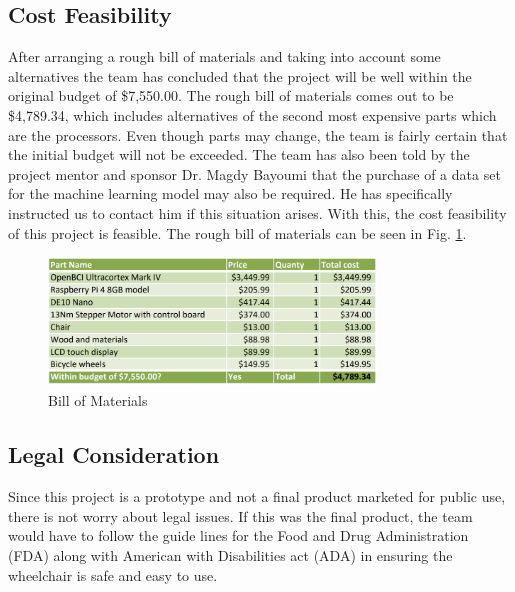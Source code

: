\documentclass[conference]{IEEEtran}
\begin{document}
        \subsection{Cost Feasibility}
        After arranging a rough bill of materials and taking into account some alternatives the team has concluded that the project will be well within the original budget of \$7,550.00. The rough bill of materials comes out to be {\$4,789.34}, which includes alternatives of the second most expensive parts which are the processors. Even though parts may change, the team is fairly certain that the initial budget will not be exceeded. The team has also been told by the project mentor and sponsor Dr. Magdy Bayoumi that the purchase of a data set for the machine learning model may also be required. He has specifically instructed us to contact him if this situation arises. With this, the cost feasibility of this project is feasible. The rough bill of materials can be seen in Fig. \ref{fig:bom}. 

        \setcounter{figure}{0}
        \renewcommand{\thefigure}{B.\arabic{figure}}
        \begin{figure}
        \centering
        \centerline{\includegraphics[height=1.35in, keepaspectratio]{figs/BOM.png}}
            \caption{Bill of Materials}
            \label{fig:bom}
        \end{figure}

        \subsection{Legal Consideration}
        Since this project is a prototype and not a final product marketed for public use, there is not worry about legal issues. If this was the final product, the team would have to follow the guide lines for the Food and Drug Administration (FDA) along with American with Disabilities act (ADA) in ensuring the wheelchair is safe and easy to use.

    \clearpage
    \onecolumn
    
\end{document}
